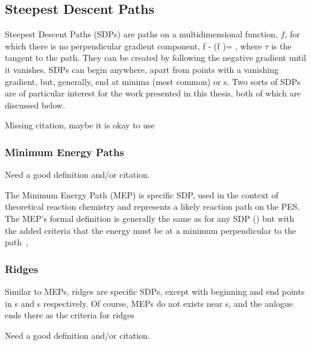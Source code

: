 \subsection{Steepest Descent Paths}
\label{sec:sdps}


Steepest Descent Paths (SDPs) are paths on a multidimensional function, $f$, for which there is no perpendicular gradient component,
\nabla f - (\nabla f \cdot \tau)\tau = ,
\eeq
where $\tau$ is the tangent to the path.
They can be created by following the negative gradient until it vanishes.
SDPs can begin anywhere, apart from points with a vanishing gradient, but, generally, end at minima (most common) or \sap{}s.
Two sorts of SDPs are of particular interest for the work presented in this thesis, both of which are discussed below.

\bit
\item Missing citation, maybe it is okay to use \cite{gradient-extramals-ruedenberg-1993}
\eit

\subsubsection{Minimum Energy Paths}
\label{sec:meps}

\bit
\item Need a good definition and/or citation.
\eit

The Minimum Energy Path (MEP) is specific SDP, used in the context of theoretical reaction chemistry and represents a likely reaction path on the PES.
The MEP's formal definition is generally the same as for any SDP () but with the added criteria that the energy must be at a minimum perpendicular to the path~\cite{neb-polemic-henkelman1},
\text{\expand}
\eeq

\subsubsection{Ridges}
\label{sec:ridges}

Similar to MEPs, ridges are specific SDPs, except with beginning and end points in s and s respectively.
Of course, MEPs do not exists near s, and the anlogue ends there as the criteria for ridges \expand

\bit
\item Need a good definition and/or citation.
\eit

